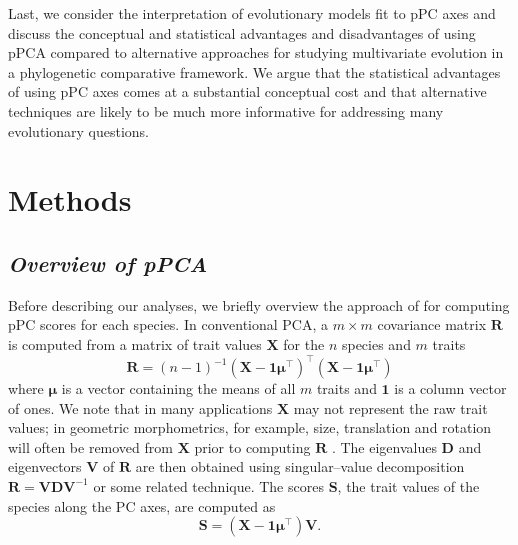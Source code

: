 \documentclass[a4paper,11pt]{article}
\begin{document}
Last, we consider the interpretation of evolutionary models fit to pPC axes and discuss the conceptual and statistical advantages and disadvantages of using pPCA compared to alternative approaches for studying multivariate evolution in a phylogenetic comparative framework. We argue that the statistical advantages of using pPC axes comes at a substantial conceptual cost and that alternative techniques are likely to be much more informative for addressing many evolutionary questions.

\section{Methods}
\subsection{\emph{Overview of pPCA}}
Before describing our analyses, we briefly overview the approach of \citet{Revell2008} for computing pPC scores for each species. In conventional PCA, a $m \times m$ covariance matrix $\mathbf{R}$ is computed from a matrix of trait values $\mathbf{X}$ for the $n$ species and $m$ traits
\begin{equation}\label{eq:rpca}
\mathbf{R} = (n-1)^{-1}(\mathbf{X} - \mathbf{1}\boldsymbol{\mu}^\intercal)^\intercal (\mathbf{X} - \mathbf{1}\boldsymbol{\mu}^\intercal)
\end{equation}
where $\boldsymbol{\mu}$ is a vector containing the means of all $m$ traits and $\mathbf{1}$ is a column vector of ones. We note that in many applications $\mathbf{X}$ may not represent the raw trait values; in geometric morphometrics, for example, size, translation and rotation will often be removed from $\mathbf{X}$ prior to computing $\mathbf{R}$ \citep{RohlfSlice, Bookstein1997}. The eigenvalues $\mathbf{D}$ and eigenvectors $\mathbf{V}$ of $\mathbf{R}$ are then obtained using singular--value decomposition $\mathbf{R}=\mathbf{V}\mathbf{D}\mathbf{V}^{-1}$ or some related technique. The scores $\mathbf{S}$, the trait values of the species along the PC axes, are computed as
\begin{equation}\label{eq:Spca}
\mathbf{S}=(\mathbf{X} - \mathbf{1}\boldsymbol{\mu}^\intercal)\mathbf{V}.
\end{equation}
\end{document}
